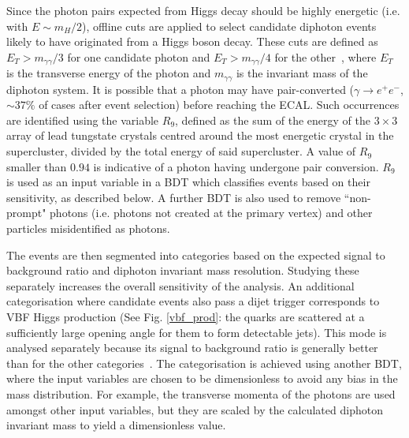 \documentclass[10pt]{article}
\begin{document}
Since the photon pairs expected from Higgs decay should be highly energetic (i.e. with $E\sim m_H/2$), offline cuts are applied to select candidate diphoton events likely to have originated from a Higgs boson decay. These cuts are defined as $E_T > m_{\gamma \gamma}/3$ for one candidate photon and $E_T > m_{\gamma \gamma}/4$ for the other~\cite{HSearch}, where $E_T$ is the transverse energy of the photon and $m_{\gamma\gamma}$ is the invariant mass of the diphoton system. It is possible that a photon may have pair-converted ($\gamma \rightarrow e^+ e^-$, $\sim 37\%$ of cases after event selection) before reaching the ECAL. Such occurrences are identified using the variable $R_9$, defined as the sum of the energy of the $3 \times 3$ array of lead tungstate crystals centred around the most energetic crystal in the supercluster, divided by the total energy of said supercluster. A value of $R_9$ smaller than $0.94$ is indicative of a photon having undergone pair conversion. $R_9$ is used as an input variable in a BDT which classifies events based on their sensitivity, as described below. A further BDT is also used to remove “non-prompt" photons (i.e. photons not created at the primary vertex) and other particles misidentified as photons.

The events are then segmented into categories based on the expected signal to background ratio and diphoton invariant mass resolution. Studying these separately increases the overall sensitivity of the analysis. An additional categorisation where candidate events also pass a dijet trigger corresponds to VBF Higgs production (See Fig. \ref{vbf_prod}: the quarks are scattered at a sufficiently large opening angle for them to form detectable jets). This mode is analysed separately because its signal to background ratio is generally better than for the other categories~\cite{HSearch}. The categorisation is achieved using another BDT, where the input variables are chosen to be dimensionless to avoid any bias in the mass distribution. For example, the transverse momenta of the photons are used amongst other input variables, but they are scaled by the calculated diphoton invariant mass to yield a dimensionless value.
\end{document}

